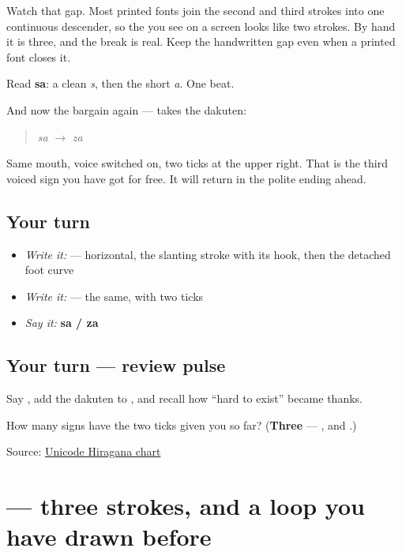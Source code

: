 Watch that gap. Most printed fonts join the second and third strokes into one continuous descender, so the  you see on a screen looks like two strokes. By hand it is three, and the break is real. Keep the handwritten gap even when a printed font closes it.

Read \textbf{sa}: a clean \emph{s}, then the short \emph{a}. One beat.

And now the bargain again —  takes the dakuten:

\begin{quote}
 \emph{sa} $\to$ \textbf{} \emph{za}
\end{quote}

Same mouth, voice switched on, two ticks at the upper right. That is the third voiced sign you have got for free. It will return in the polite ending ahead.

\subsection*{Your turn}
\begin{itemize}
\raggedright
  \item \emph{Write it:}  — horizontal, the slanting stroke with its hook, then the detached foot curve
  \item \emph{Write it:}  — the same, with two ticks
  \item \emph{Say it:} \textbf{sa / za}
\end{itemize}

\subsection*{Your turn — review pulse}
Say \textbf{}, add the dakuten to \textbf{}, and recall how “hard to exist” became thanks.

\begin{tcolorbox}[breakable,colback=teal!4,colframe=teal!35!black,title={Before you move on}]
How many signs have the two ticks given you so far? (\textbf{Three} — ,  and .)

Source: \href{https://www.unicode.org/charts/PDF/U3040.pdf}{Unicode Hiragana chart}
\end{tcolorbox}
\section[\texorpdfstring{\ja{ま} (ma)}{ま (ma)}]{ — three strokes, and a loop you have drawn before}

